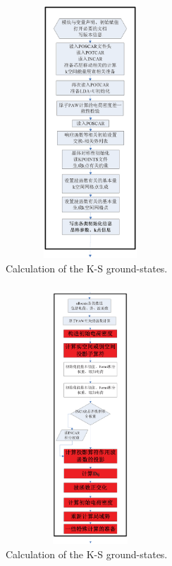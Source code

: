 \documentclass[cjk,slidestop,compress,mathserif,blue]{beamer}
\begin{document}
\frame
{
\frametitle{}
\begin{figure}[h!]
\centering
\vspace*{-0.80in}
\includegraphics[height=3.72in,width=2.5in,viewport=160 118 395 755,clip]{Figures/VASP_main_Flow-1.eps}
\caption{\small \textrm{Calculation of the K-S ground-states.}}%
\label{VASP_Follow}
\end{figure}
}

\frame
{
\frametitle{}
\begin{figure}[h!]
\centering
\vspace*{-0.85in}
\includegraphics[height=3.72in,width=2.5in,viewport=176 16 416 819,clip]{Figures/VASP_main_Flow-2.eps}
\caption{\small \textrm{Calculation of the K-S ground-states.}}%
\label{VASP_Follow}
\end{figure}
}
\end{document}
